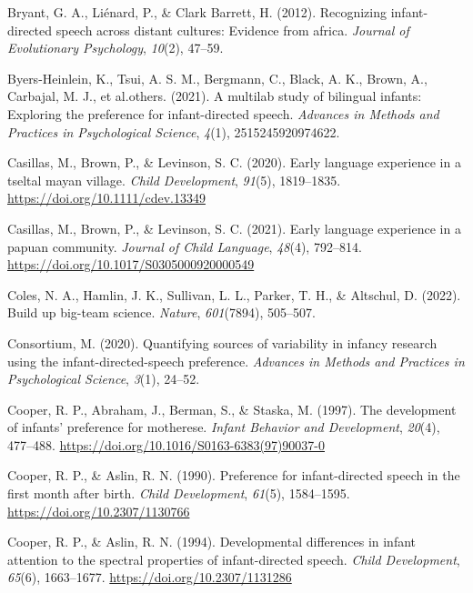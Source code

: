 \documentclass[
  ,man,floatsintext]{apa6}
\newlength{\cslhangindent}
\newlength{\cslentryspacingunit} %
\newenvironment{CSLReferences}[2] %
 {%
  \setlength{\parindent}{0pt}
  \ifodd #1
  \let\oldpar\par
  \def\par{\hangindent=\cslhangindent\oldpar}
  \fi
  \setlength{\parskip}{#2\cslentryspacingunit}
 }%
 {}
\begin{document}
\begin{CSLReferences}{1}{0}
\leavevmode{}%
Bryant, G. A., Liénard, P., \& Clark Barrett, H. (2012). Recognizing infant-directed speech across distant cultures: Evidence from africa. \emph{Journal of Evolutionary Psychology}, \emph{10}(2), 47--59.

\leavevmode{}%
Byers-Heinlein, K., Tsui, A. S. M., Bergmann, C., Black, A. K., Brown, A., Carbajal, M. J., et al.others. (2021). A multilab study of bilingual infants: Exploring the preference for infant-directed speech. \emph{Advances in Methods and Practices in Psychological Science}, \emph{4}(1), 2515245920974622.

\leavevmode{}%
Casillas, M., Brown, P., \& Levinson, S. C. (2020). Early language experience in a tseltal mayan village. \emph{Child Development}, \emph{91}(5), 1819--1835. \url{https://doi.org/10.1111/cdev.13349}

\leavevmode{}%
Casillas, M., Brown, P., \& Levinson, S. C. (2021). Early language experience in a papuan community. \emph{Journal of Child Language}, \emph{48}(4), 792--814. \url{https://doi.org/10.1017/S0305000920000549}

\leavevmode{}%
Coles, N. A., Hamlin, J. K., Sullivan, L. L., Parker, T. H., \& Altschul, D. (2022). Build up big-team science. \emph{Nature}, \emph{601}(7894), 505--507.

\leavevmode{}%
Consortium, M. (2020). Quantifying sources of variability in infancy research using the infant-directed-speech preference. \emph{Advances in Methods and Practices in Psychological Science}, \emph{3}(1), 24--52.

\leavevmode{}%
Cooper, R. P., Abraham, J., Berman, S., \& Staska, M. (1997). The development of infants' preference for motherese. \emph{Infant Behavior and Development}, \emph{20}(4), 477--488. \url{https://doi.org/10.1016/S0163-6383(97)90037-0}

\leavevmode{}%
Cooper, R. P., \& Aslin, R. N. (1990). Preference for infant-directed speech in the first month after birth. \emph{Child Development}, \emph{61}(5), 1584--1595. \url{https://doi.org/10.2307/1130766}

\leavevmode{}%
Cooper, R. P., \& Aslin, R. N. (1994). Developmental differences in infant attention to the spectral properties of infant-directed speech. \emph{Child Development}, \emph{65}(6), 1663--1677. \url{https://doi.org/10.2307/1131286}


\end{CSLReferences}
\end{document}
